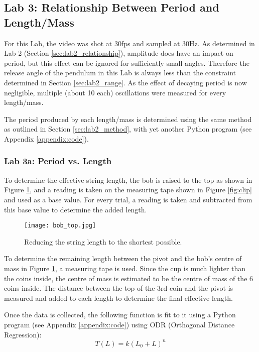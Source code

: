 \documentclass[aps,twocolumn,secnumarabic,nobalancelastpage,amsmath,amssymb,nofootinbib,floatfix,letterpaper]{revtex4}
\begin{document}
\subsection{Lab 3: Relationship Between Period and Length/Mass}
\label{sec:lab3_method}

For this Lab, the video was shot at 30fps and sampled at 30Hz. As determined in Lab 2 (Section \ref{sec:lab2_relationship}),
amplitude does have an impact on period, but this effect can be ignored for sufficiently small angles. Therefore the release
angle of the pendulum in this Lab is always less than the constraint determined in Section \ref{sec:lab2_range}.
As the effect of decaying period is now negligible, multiple (about 10 each) oscillations were measured for every
length/mass.

The period produced by each length/mass is determined using the same method as outlined in Section
\ref{sec:lab2_method}, with yet another Python program (see Appendix \ref{appendix:code}).

\subsubsection{Lab 3a: Period vs. Length}

To determine the effective string length, the bob is raised to the top as shown in Figure \ref{fig:raised_bob}, and a
reading is taken on the measuring tape shown in Figure \ref{fig:clip} and used as a base value. For
every trial, a reading is taken and subtracted from this base value to determine the added length.

\begin{figure}[htb]
    \texttt{[image: bob\_top.jpg]}
    \caption{Reducing the string length to the shortest possible.}
    \label{fig:raised_bob}
\end{figure}

To determine the remaining length between the pivot and the bob's centre of mass in Figure \ref{fig:raised_bob}, a
measuring tape is used. Since the cup is much lighter than the coins inside, the centre of mass is estimated to be the
centre of mass of the 6 coins inside. The distance between the top of the 3rd coin and the pivot is measured and added
to each length to determine the final effective length.

Once the data is collected, the following function is fit to it using a Python program (see Appendix \ref{appendix:code})
using ODR (Orthogonal Distance Regression):
\begin{equation}
    T(L) = k(L_0 + L)^n
    \label{eqn:period}
\end{equation}
\end{document}
